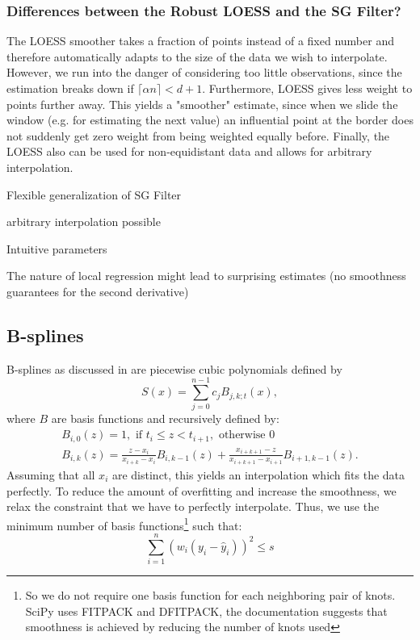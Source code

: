 		\subsubsection{Differences between the Robust LOESS and the SG Filter?}
		The LOESS smoother takes a fraction of points instead of a fixed number and therefore automatically adapts to the size of the data we wish to interpolate. However, we run into the danger of considering too little observations, since the estimation breaks down if $\lceil \alpha n\rceil < d+1$.
		Furthermore, LOESS gives less weight to points further away. This yields a "smoother" estimate, since when we slide the window (e.g. for estimating the next value) an influential point at the border does not suddenly get zero weight from being weighted equally before.
		Finally, the LOESS also can be used for non-equidistant data and allows for arbitrary interpolation.

		\begin{my_pros_cons_table}{
				\item Flexible generalization of SG Filter
				\item arbitrary interpolation possible
				\item Intuitive parameters
			}{
				\item The nature of local regression might lead to surprising estimates (no smoothness guarantees for the second derivative)
			}
		\end{my_pros_cons_table}


	\subsection{B-splines}
		\label{sec:B}
		B-splines as discussed in \cite{lycheSplineMethods2005} are piecewise cubic polynomials defined by 
		$$
			S(x)=\sum_{j=0}^{n-1} c_{j} B_{j, k ; t}(x),
		$$
		where $B$ are basis functions and recursively defined by:
		$$
			\begin{array}{r}
				B_{i, 0}(z)=1, \text { if } t_{i} \leq z<t_{i+1}, \text { otherwise } 0 \\
				B_{i, k}(z)=\frac{z-x_{i}}{x_{i+k}-x_{i}} B_{i, k-1}(z)+\frac{x_{i+k+1}-z}{x_{i+k+1}-x_{i+1}} B_{i+1, k-1}(z).
			\end{array}
		$$
		Assuming that all $x_i$ are distinct, this yields an interpolation which fits the data perfectly. To reduce the amount of overfitting and increase the smoothness, we relax the constraint that we have to perfectly interpolate. Thus, we use the minimum number of basis functions\footnote{So we do not require one basis function for each neighboring pair of knots. SciPy uses FITPACK and DFITPACK, the documentation suggests that smoothness is achieved by reducing the number of knots used} such that:
		$$\sum_{i=1}^n(w_i (y_i - \hat y_i))^2 \leq s$$

